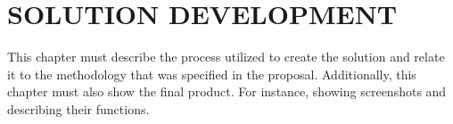 \chapter{SOLUTION DEVELOPMENT}

This chapter must describe the process utilized to create the solution and relate it to the methodology that was specified in the proposal. Additionally, this chapter must also show the final product. For instance, showing screenshots and describing their functions.
